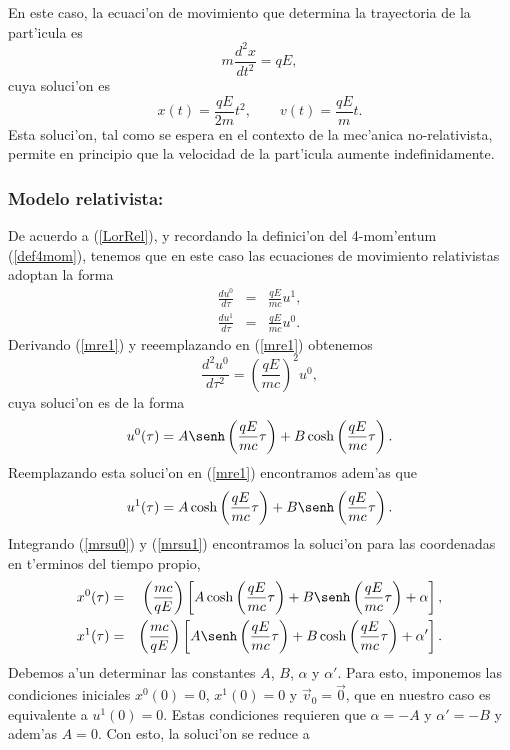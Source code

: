 En este caso, la ecuaci'on de movimiento que determina la trayectoria de la
part'icula es
\begin{equation}
m\frac{d^2x}{dt^2}=qE,
\end{equation}
cuya soluci'on es
\begin{equation}
x(t)=\frac{qE}{2m}t^2, \qquad v(t)=\frac{qE}{m}t.
\end{equation}
Esta soluci'on, tal como se espera en el contexto de la mec'anica
no-relativista, permite en principio que la velocidad de la part'icula aumente
indefinidamente.

\subsubsection{Modelo relativista:}

De acuerdo a (\ref{LorRel}), y recordando la definici'on del 4-mom'entum (\ref{def4mom}), tenemos que en este caso las ecuaciones de movimiento relativistas adoptan la forma
\begin{eqnarray}
\frac{du^0}{d\tau}&=& \frac{qE}{mc} u^1, \label{mre1} \\
\frac{du^1}{d\tau}&=&\frac{qE}{mc} u^0.\label{mre2}
\end{eqnarray}
Derivando (\ref{mre1}) y reeemplazando en (\ref{mre1}) obtenemos
\begin{equation}
 \frac{d^2u^0}{d\tau^2}=\left( \frac{qE}{mc}\right)^2 u^0,
\end{equation}
cuya soluci'on es de la forma
\begin{equation}
u^0(\tau)=A\senh\left( \frac{qE}{mc}\tau\right)+B\cosh\left(
\frac{qE}{mc}\tau\right). \label{mrsu0}
\end{equation}
Reemplazando esta soluci'on en (\ref{mre1}) encontramos adem'as que
\begin{equation}
u^1(\tau)=A\cosh\left( \frac{qE}{mc}\tau\right)+B\senh\left(
\frac{qE}{mc}\tau\right). \label{mrsu1}
\end{equation}
Integrando (\ref{mrsu0}) y (\ref{mrsu1}) encontramos la soluci'on para las coordenadas en t'erminos del tiempo propio,
\begin{eqnarray}
x^0(\tau)&=&\left(\frac{mc}{qE}\right)\left[A\cosh\left( \frac{qE}{mc}\tau\right)+B\senh\left(
\frac{qE}{mc}\tau\right)+\alpha\right] ,\\
x^1(\tau)&=&\left(\frac{mc}{qE}\right)\left[A\senh\left( \frac{qE}{mc}\tau\right)+B\cosh\left(
\frac{qE}{mc}\tau\right)+\alpha'\right] .
\end{eqnarray}
Debemos a'un determinar las constantes $A$, $B$, $\alpha$ y $\alpha'$. Para esto, imponemos las condiciones iniciales $x^0(0)=0$, $x^1(0)=0$ y $\vec{v}_0=\vec{0}$, que en nuestro caso es equivalente a $u^1(0)=0$. Estas condiciones requieren que $\alpha=-A$ y $\alpha'=-B$ y adem'as $A=0$. Con esto, la soluci'on se reduce a
